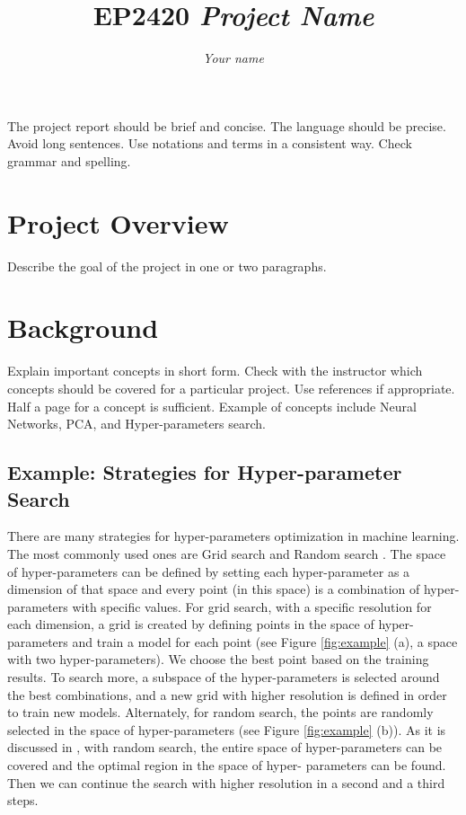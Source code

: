 \documentclass[10pt]{article} %
\title{EP2420 \textit{Project Name}}
\author{\textit{Your name}}
\begin{document}
\maketitle
\noindent The project report should be brief and concise. The language should be precise. Avoid long sentences. Use notations and terms in a consistent way. Check grammar and spelling.
\section*{Project Overview}
Describe the goal of the project in one or two paragraphs.
    
\section*{Background}
Explain important concepts in short form. Check with the instructor which concepts should be covered for a particular project. Use references if appropriate. Half a page for a concept is sufficient. Example of concepts include Neural Networks, PCA, and Hyper-parameters search.
\subsection*{Example: Strategies for Hyper-parameter Search}
 
There are many strategies for hyper-parameters optimization in machine learning. The most commonly used ones are Grid search \cite{larochelle2007empirical} and Random search \cite{bergstra2012random}. The space of hyper-parameters can be defined by setting each hyper-parameter as a dimension of that space and every point (in this space) is a combination of hyper- parameters with specific values. For grid search, with a specific resolution for each dimension, a grid is created by defining points in the space of hyper-parameters and train a model for each point (see Figure \ref{fig:example} (a), a space with two hyper-parameters). We choose the best point based on the training results. To search more, a subspace of the hyper-parameters is selected around the best combinations, and a new grid with higher resolution is defined in order to train new models. Alternately, for random search, the points are randomly selected in the space of hyper-parameters (see Figure \ref{fig:example} (b)). As it is discussed in \cite{bergstra2012random} , with random search, the entire space of hyper-parameters can be covered and the optimal region in the space of hyper- parameters can be found. Then we can continue the search with higher resolution in a second and a third steps.
\end{document}
